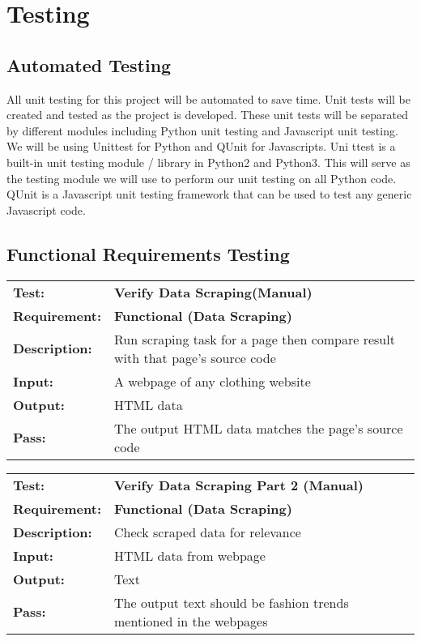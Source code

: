\documentclass{article}
\begin{document}


\newpage 

\section{Testing}


	\subsection{Automated Testing}
	All unit testing for this project will be automated to save time. Unit tests will be created and tested as the project is developed. These unit tests will be separated by different modules including Python unit testing and Javascript unit testing. We will be using Unittest for Python and QUnit for Javascripts. Uni ttest is a built-in unit testing module / library in Python2 and Python3. This will serve as the testing module we will use to perform our unit testing on all Python code. QUnit is a Javascript unit testing framework that can be used to test any generic Javascript code.

	\newpage

	\subsection{Functional Requirements Testing}

	\begin{mdframed}[linewidth=1pt]
	\begin{tabularx}{\textwidth}{@{}p{3cm}X@{}}
	{\bf Test:} & {\bf Verify Data Scraping(Manual)}\\[\baselineskip]
	{\bf Requirement:} & {\bf Functional (Data Scraping)}\\[\baselineskip]
	{\bf Description:} & Run scraping task for a page then compare result with that page's source code\\[0.5\baselineskip]
	{\bf Input:} &  A webpage of any clothing website\\[0.5\baselineskip]
	{\bf Output:} & HTML data\\[0.5\baselineskip]
	{\bf Pass:} & The output HTML data matches the page's source code
	\end{tabularx}
	\end{mdframed}

	\begin{mdframed}[linewidth=1pt]
	\begin{tabularx}{\textwidth}{@{}p{3cm}X@{}}
	{\bf Test:} & {\bf Verify Data Scraping Part 2 (Manual)}\\[\baselineskip]
	{\bf Requirement:} & {\bf Functional (Data Scraping)}\\[\baselineskip]
	{\bf Description:} & Check scraped data for relevance\\[0.5\baselineskip]
	{\bf Input:} &  HTML data from webpage\\[0.5\baselineskip]
	{\bf Output:} & Text \\[0.5\baselineskip]
	{\bf Pass:} & The output text should be fashion trends mentioned in the webpages
	\end{tabularx}
	\end{mdframed}
\end{document}
